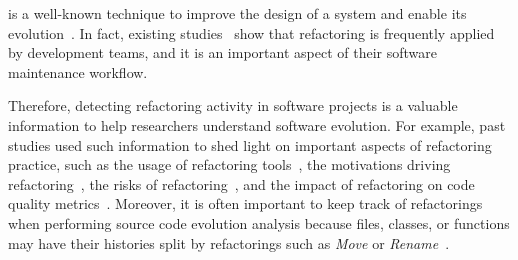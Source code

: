 



% 
% 
% 
% 
 is a well-known technique to improve the design of a system and enable its evolution~\cite{Fowler:1999}.
In fact, existing studies~\cite{MurphyHill2012, tsantalis_empiricalstudy, Kim:2012:FSE, kim-tse-2014, fse2016-why-we-refactor} show that refactoring is frequently applied by development teams, and it is an important aspect of their software maintenance workflow.


Therefore, detecting refactoring activity in software projects is a valuable information to help researchers understand software evolution.
For example, past studies used such information to shed light on important aspects of refactoring practice, such as the usage of refactoring tools~\cite{negara2013, MurphyHill2012}, the motivations driving refactoring~\cite{Kim:2012:FSE, kim-tse-2014, fse2016-why-we-refactor}, the risks of refactoring~\cite{Kim:2012:FSE, kim-tse-2014, Kim:2011, weissgerber2006refactorings, bavota2012does}, and the impact of refactoring on code quality metrics~\cite{Kim:2012:FSE, kim-tse-2014}.
Moreover, it is often important to keep track of refactorings when performing source code evolution analysis because files, classes, or functions may have their histories split by  refactorings such as \emph{Move} or \emph{Rename}~\cite{icse2018}.

